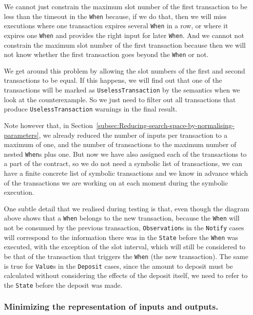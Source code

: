 \documentclass[english,runningheads]{llncs}
\begin{document}
We cannot just constrain the maximum slot number of the first transaction
to be less than the timeout in the \texttt{When} because, if we do
that, then we will miss executions where one transaction expires several
\texttt{When} in a row, or where it expires one \texttt{When} and provides
the right input for later \texttt{When}. And we cannot not constrain
the maximum slot number of the first transaction because then we will
not know whether the first transaction goes beyond the \texttt{When}
or not.

We get around this problem by allowing the slot numbers of the first
and second transactions to be equal. If this happens, we will find
out that one of the transactions will be marked as \texttt{UselessTransaction}
by the semantics when we look at the counterexample. So we just need
to filter out all transactions that produce \texttt{UselessTransaction}
warnings in the final result.

Note however that, in Section~\ref{subsec:Reducing-search-space-by-normalising-parameters},
we already reduced the number of inputs per transaction to a maximum
of one, and the number of transactions to the maximum number of nested
\texttt{When}s plus one. But now we have also assigned each of the
transactions to a part of the contract, so we do not need a symbolic
list of transactions, we can have a finite concrete list of symbolic
transactions and we know in advance which of the transactions we are
working on at each moment during the symbolic execution.

One subtle detail that we realised during testing is that, even though
the diagram above shows that a \texttt{When} belongs to the new transaction,
because the \texttt{When} will not be consumed by the previous transaction,
\texttt{Observation}s in the \texttt{Notify} cases will correspond to the
information there was in the \texttt{State} before the \texttt{When}
was executed, with the exception of the slot interval, which will still be
considered to be that of the transaction that triggers the \texttt{When} (the
new transaction). The same is true for \texttt{Value}s in the \texttt{Deposit}
cases, since the amount to deposit must be calculated without considering the
effects of the deposit itself, we need to refer to the \texttt{State} before
the deposit was made.

\subsubsection{Minimizing the representation of inputs and outputs.}
\end{document}
